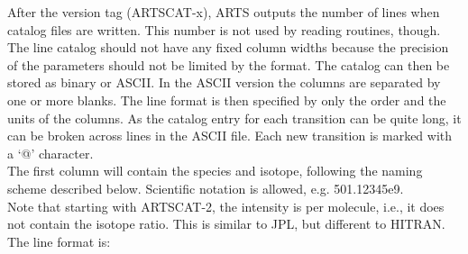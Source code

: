 {After the version tag (ARTSCAT-x), ARTS outputs the number of lines when catalog files are written. This number is not used by reading routines, though.\\
The line catalog should not have any fixed column widths because the precision of the parameters should not be limited by the format. The catalog can then be stored as binary or ASCII. In the ASCII version the columns are separated by one or more blanks. The line format is then specified by only the order and the units of the columns. As the catalog entry for each transition can be quite long, it can be broken across lines in the ASCII file. Each new transition is marked with a `@' character.\\
The first column will contain the species and isotope, following the naming scheme described below. Scientific notation is allowed, e.g. 501.12345e9.\\
Note that starting with ARTSCAT-2, the intensity is per molecule, i.e., it does not contain the isotope ratio. This is similar to JPL, but different to HITRAN.\\ 
The line format is:

\begin{verbatim}


\end{verbatim}}
